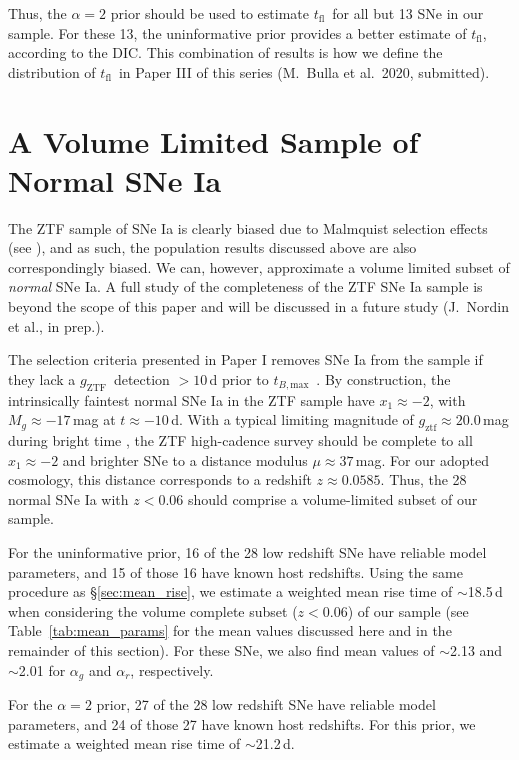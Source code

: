 \documentclass[twocolumn]{./aastex63}
\newcommand{\gztf}{$g_\mathrm{ZTF}$}
\newcommand{\tfl}{$t_\mathrm{fl}$}
\newcommand{\tbmax}{$t_{B,\mathrm{max}}$}
\begin{document}
Thus, the $\alpha = 2$ prior should be used to estimate \tfl\ for all but 13
SNe in our sample. For these 13, the uninformative prior provides a better
estimate of \tfl, according to the DIC. This combination of results is how we
define the distribution of \tfl\ in Paper III of this series (M.~Bulla et
al.~2020, submitted).

\section{A Volume Limited Sample of Normal SNe Ia}\label{sec:volume_limited}

The ZTF sample of SNe Ia is clearly biased due to Malmquist selection effects
(see \citealt{Yao19}), and as such, the population results discussed above are
also correspondingly biased. We can, however, approximate a volume limited
subset of \textit{normal} SNe Ia. A full study of the completeness of the ZTF
SNe Ia sample is beyond the scope of this paper and will be discussed in a
future study (J.~Nordin et al., in prep.).

The selection criteria presented in Paper I removes SNe Ia from the sample if
they lack a \gztf\ detection $> 10$\,d prior to \tbmax\ \citep{Yao19}. By
construction, the intrinsically faintest normal SNe Ia in the ZTF sample have
$x_1 \approx -2$, with $M_g \approx -17$\,mag at $t \approx -10$\,d. With a
typical limiting magnitude of $g_\mathrm{ztf} \approx 20.0$\,mag during bright
time \citep{Bellm19}, the ZTF high-cadence survey should be complete to all
$x_1 \approx -2$ and brighter SNe to a distance modulus $\mu \approx 37$\,mag.
For our adopted cosmology, this distance corresponds to a redshift $z \approx
0.0585$. Thus, the 28 normal SNe Ia with $z < 0.06$ should comprise a
volume-limited subset of our sample.

For the uninformative prior, 16 of the 28 low redshift SNe have reliable model
parameters, and 15 of those 16 have known host redshifts. Using the same
procedure as \S\ref{sec:mean_rise}, we estimate a weighted mean rise time of
$\sim$18.5\,d when considering the volume complete subset ($z < 0.06$) of our
sample (see Table~\ref{tab:mean_params} for the mean values discussed here and
in the remainder of this section). For these SNe, we also find mean values of
$\sim$2.13 and $\sim$2.01 for $\alpha_g$ and $\alpha_r$, respectively.

For the $\alpha = 2$ prior, 27 of the 28 low redshift SNe have reliable model
parameters, and 24 of those 27 have known host redshifts. For this prior, we
estimate a weighted mean rise time of $\sim$21.2\,d.
\end{document}
